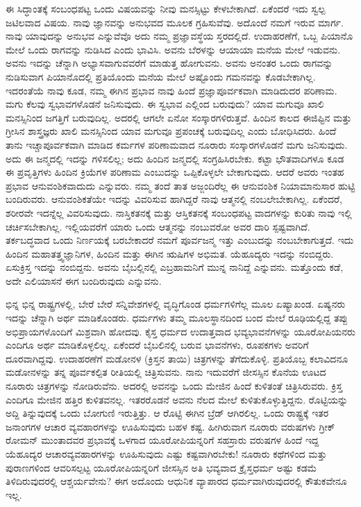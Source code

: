 ಈ ಸಿದ್ಧಾಂತಕ್ಕೆ ಸಂಬಂಧಪಟ್ಟ ಒಂದು ವಿಷಯವನ್ನು ನೀವು ಮನಸ್ಸಿಟ್ಟು ಕೇಳಬೇಕಾಗಿದೆ. ಏಕೆಂದರೆ ಇದು ಸ್ವಲ್ಪ ಜಟಿಲವಾದ ವಿಷಯ. ನಾವು ಜ್ಞಾನವನ್ನು ಅನುಭವದ ಮೂಲಕ ಗ್ರಹಿಸುವೆವು. ಅದೊಂದೆ ನಮಗೆ ಇರುವ ಮಾರ್ಗ. ನಾವು ಯಾವುದನ್ನು ಅನುಭವ ಎನ್ನುವೆವೊ ಅದು ನಮ್ಮ ಪ್ರಜ್ಞಾವಸ್ಥೆಯ ಸ್ತರದಲ್ಲಿದೆ. ಉದಾಹರಣೆಗೆ, ಒಬ್ಬ ಪಿಯಾನೊ ಮೇಲೆ ಒಂದು ರಾಗವನ್ನು ನುಡಿಸಿದ ಎಂದು ಭಾವಿಸಿ. ಅವನು ಬೆರಳನ್ನು ಆಯಾಯಾ ಮನೆಯ ಮೇಲೆ ಇಡುವನು. ಅವನು ಇದನ್ನು ಚೆನ್ನಾಗಿ ಅಭ್ಯಾಸವಾಗುವವರೆಗೆ ಮಾಡುತ್ತ ಹೋಗುವನು. ಅವನು ಅನಂತರ ಒಂದು ರಾಗವನ್ನು ನುಡಿಸುವಾಗ ಪಿಯಾನೊದಲ್ಲಿ ಪ್ರತಿಯೊಂದು ಮನೆಯ ಮೇಲೆ ಅಷ್ಟೊಂದು ಗಮನವನ್ನು ಕೊಡಬೇಕಾಗಿಲ್ಲ. ಇದರಂತೆಯೆ ನಾವು ಕೂಡ, ನಮ್ಮ ಈಗಿನ ಪ್ರಭಾವ ನಾವು ಹಿಂದೆ ಪ್ರಜ್ಞಾಪೂರ್ವಕವಾಗಿ ಮಾಡಿದುದರ ಪರಿಣಾಮ. ಮಗು ಕೆಲವು ಸ್ವಭಾವಗಳೊಡನೆ ಜನಿಸುವುದು. ಈ ಸ್ವಭಾವ ಎಲ್ಲಿಂದ ಬರುವುದು? ಯಾವ ಮಗುವೂ ಖಾಲಿ ಮನಸ್ಸಿನಿಂದ ಜಗತ್ತಿಗೆ ಬರುವುದಿಲ್ಲ. ಅದರಲ್ಲಿ ಆಗಲೇ ಏನೋ ಸಂಸ್ಕಾರಗಳಿರುತ್ತವೆ. ಹಿಂದಿನ ಕಾಲದ ಈಜಿಪ್ಟಿನ ಮತ್ತು ಗ್ರೀಸಿನ ಶಾಸ್ತ್ರಜ್ಞರು ಖಾಲಿ ಮನಸ್ಸಿನಿಂದ ಯಾವ ಮಗುವೂ ಪ್ರಪಂಚಕ್ಕೆ ಬರುವುದಿಲ್ಲ ಎಂದು ಬೋಧಿಸಿದರು. ಹಿಂದೆ ತಾನು ಇಚ್ಚಾಪೂರ್ವಕವಾಗಿ ಮಾಡಿದ ಕರ್ಮಗಳ ಪರಿಣಾಮವಾದ ನೂರಾರು ಸಂಸ್ಕಾರಗಳೊಡನೆ ಮಗು ಜನಿಸುವುದು. ಅದು ಈ ಜನ್ಮದಲ್ಲಿ ಇದನ್ನು ಗಳಿಸಲಿಲ್ಲ; ಅದು ಹಿಂದಿನ ಜನ್ಮದಲ್ಲಿ ಸಂಗ್ರಹಿಸಿರಬೇಕು. ಕಟ್ಟಾ ಭೌತವಾದಿಗಳೂ ಕೂಡ ಈ ಪ್ರವೃತ್ತಿಗಳು ಹಿಂದಿನ ಕ್ರಿಯೆಗಳ ಪರಿಣಾಮ ಎಂಬುದನ್ನು ಒಪ್ಪಿಕೊಳ್ಳಲೇ ಬೇಕಾಗುವುದು. ಆದರೆ ಅವರು ಇಂತಹ ಪ್ರಭಾವ ಆನುವಂಶಿಕವಾದುದು ಎನ್ನುವರು. ನಮ್ಮ ತಂದೆ ತಾತ ಅಜ್ಜಂದಿರೆಲ್ಲ ಈ ಆನುವಂಶಿಕ ನಿಯಾಮಾನುಸಾರ ಹುಟ್ಟಿ ಬಂದಿರುವರು. ಆನುವಂಶಿಕತೆಯೇ ಇದನ್ನು ವಿವರಿಸುವ ಹಾಗಿದ್ದರೆ ನಾವು ಆತ್ಮನಲ್ಲಿ ನಂಬಲೇಬೇಕಾಗಿಲ್ಲ. ಏಕೆಂದರೆ, ಶರೀರವೇ ಇದನ್ನೆಲ್ಲ ವಿವರಿಸುವುದು. ನಾಸ್ತಿಕತನಕ್ಕೆ ಮತ್ತು ಆಸ್ತಿಕತನಕ್ಕೆ ಸಂಬಂಧಪಟ್ಟ ವಾದಗಳನ್ನು ಕುರಿತು ನಾವು ಇಲ್ಲಿ ಚರ್ಚಿಸಬೇಕಾಗಿಲ್ಲ. ಇಲ್ಲಿಯವರೆಗೆ ಯಾರು ಒಂದು ಆತ್ಮನನ್ನು ನಂಬುವರೋ ಅವರ ದಾರಿ ಸ್ಪಷ್ಟವಾಗಿದೆ. ತರ್ಕಬದ್ಧವಾದ ಒಂದು ನಿರ್ಣಯಕ್ಕೆ ಬರಬೇಕಾದರೆ ನಮಗೆ ಪೂರ್ವಜನ್ಮ ಇತ್ತು ಎಂಬುದನ್ನು ನಂಬಬೇಕಾಗುತ್ತದೆ. ಇದು ಹಿಂದಿನ ಮಹಾತತ್ತ್ವಜ್ಞಾನಿಗಳ, ಹಿಂದಿನ ಮತ್ತು ಈಗಿನ ಋಷಿಗಳ ಅಭಿಮತ. ಯೆಹೂದ್ಯರು ಇದನ್ನು ನಂಬಿದ್ದರು. ಏಸುಕ್ರಿಸ್ತ ಇದನ್ನು ನಂಬಿದ್ದನು. ಅವನು ಬೈಬಲ್ಲಿನಲ್ಲಿ ಎಬ್ರಹಾಮನಿಗೆ ಮುನ್ನ ನಾನಿದ್ದೆ ಎನ್ನುವನು. ಮತ್ತೊಂದು ಕಡೆ, ಅದೇ ಎಲಿಯಾಸನೆ ಈಗ ಬಂದಿರುವುದು ಎನ್ನುವನು.

ಭಿನ್ನ ಭಿನ್ನ ರಾಷ್ಟ್ರಗಳಲ್ಲಿ, ಬೇರೆ ಬೇರೆ ಸನ್ನಿವೇಶಗಳಲ್ಲಿ ವೃದ್ಧಿಗೊಂಡ ಧರ್ಮಗಳಿಗೆಲ್ಲ ಮೂಲ ಏಷ್ಯಾಖಂಡ. ಏಷ್ಯನರು ಇದನ್ನು ಚೆನ್ನಾಗಿ ಅರ್ಥ ಮಾಡಿಕೊಂಡರು. ಧರ್ಮಗಳು ತಮ್ಮ ಮೂಲಸ್ಥಾನದಿಂದ ಬಂದ ಮೇಲೆ ರೂಢಿಯಲ್ಲಿದ್ದ ತಪ್ಪು ಅಭಿಪ್ರಾಯಗಳೊಂದಿಗೆ ಮಿಶ್ರವಾಗಿ ಹೋದವು. ಕೈಸ್ತ ಧರ್ಮದ ಉದಾತ್ತವಾದ ಭವ್ಯಭಾವನೆಗಳನ್ನು ಯೂರೋಪಿಯನರು ಎಂದಿಗೂ ಅರ್ಥ ಮಾಡಿಕೊಳ್ಳಲಿಲ್ಲ. ಏಕೆಂದರೆ ಬೈಬಲಿನಲ್ಲಿ ಬರುವ ಭಾವನೆಗಳು, ರೂಪಕಗಳು ಅವರಿಗೆ ದೂರವಾಗಿದ್ದವು. ಉದಾಹರಣೆಗೆ ಮಡೋನಳ (ಕ್ರಿಸ್ತನ ತಾಯಿ) ಚಿತ್ರಗಳನ್ನು ತೆಗೆದುಕೊಳ್ಳಿ. ಪ್ರತಿಯೊಬ್ಬ ಕಲಾವಿದನೂ ಮಡೋನಳನ್ನು ತನ್ನ ಪೂರ್ವಕಲ್ಪಿತ ರೀತಿಯಲ್ಲಿ ಚಿತ್ರಿಸುವನು. ನಾನು ಇದುವರೆಗೆ ಜೀಸಸ್ಸಿನ ಕೊನೆಯ ಊಟದ ನೂರಾರು ಚಿತ್ರಗಳನ್ನು ನೋಡಿರುವೆನು. ಅದರಲ್ಲಿ ಅವನನ್ನು ಒಂದು ಮೇಜಿನ ಹಿಂದೆ ಕುಳಿತಂತೆ ಚಿತ್ರಿಸಿರುವರು. ಕ್ರಿಸ್ತ ಎಂದಿಗೂ ಮೇಜಿನ ಹತ್ತಿರ ಕುಳಿತವನಲ್ಲ. ಇತರರೊಡನೆ ಅವನು ನೆಲದ ಮೇಲೆ ಕುಳಿತುಕೊಳ್ಳುತ್ತಿದ್ದನು. ರೊಟ್ಟಿಯನ್ನು ಅದ್ದಿ ತಿನ್ನುವುದಕ್ಕೆ ಒಂದು ಬೋಗುಣಿ ಇರುತ್ತಿತ್ತು. ಆ ರೊಟ್ಟಿ ಈಗಿನ ಬ್ರೆಡ್ ಆಗಿರಲಿಲ್ಲ. ಒಂದು ರಾಷ್ಟ್ರಕ್ಕೆ ಇತರ ಜನಾಂಗಗಳ ಆಚಾರ ವ್ಯವಹಾರಗಳನ್ನು ಊಹಿಸುವುದು ಬಹಳ ಕಷ್ಟ. ಹೀಗಿರುವಾಗ ನೂರಾರು ವರುಷಗಳು ಗ್ರೀಕ್ ರೋಮನ್ ಮುಂತಾದವರ ಪ್ರಭಾವಕ್ಕೆ ಒಳಗಾದ ಯೂರೋಪಿಯನ್ನರಿಗೆ ಸಹಸ್ರಾರು ವರುಷಗಳ ಹಿಂದೆ ಇದ್ದ ಯೆಹೂದ್ಯರ ಆಚಾರವ್ಯವಹಾರಗಳನ್ನು ಊಹಿಸುವುದು ಎಷ್ಟು ಕಷ್ಟವಾಗಿರಬೇಕು! ನೂರಾರು ಕಥೆಗಳಿಂದ ಮತ್ತು ಪುರಾಣಗಳಿಂದ ಆವರಿಸಲ್ಪಟ್ಟ ಯೂರೋಪಿಯನ್ನರಿಗೆ ಜೀಸಸ್ಸಿನ ಅತಿ ಭವ್ಯವಾದ ಕ್ರೈಸ್ತಧರ್ಮ ಅಷ್ಟು ಕಡಮೆ ತಿಳಿದಿರುವುದರಲ್ಲಿ ಆಶ್ಚರ್ಯವೇನು? ಈಗ ಅದೊಂದು ಆಧುನಿಕ ವ್ಯಾಪಾರದ ಧರ್ಮವಾಗಿರುವುದರಲ್ಲಿ ಕೌತುಕವೇನೂ ಇಲ್ಲ.


